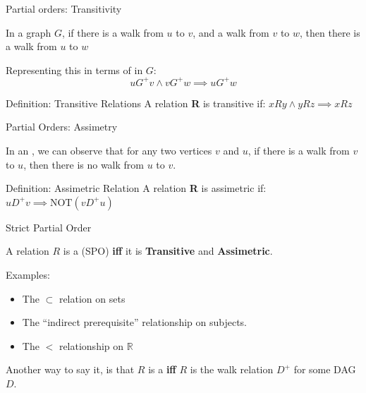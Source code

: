 
\begin{frame}{Partial orders: Transitivity}

  In a graph $G$, if there is a walk from $u$ to $v$, and a walk from $v$ to $w$, then there is a walk from $u$ to $w$
  \begin{center}
  \end{center}\bigskip

  Representing this in terms of  in $G$:
  \begin{equation*}
    uG^+v \land vG^+w \implies uG^+w
  \end{equation*}\bigskip

  \begin{block}{Definition: Transitive Relations}
    A relation {\bf R} is transitive if:\hspace{1cm} $xRy \land yRz \implies xRz$
  \end{block}
\end{frame}

\begin{frame}{Partial Orders: Assimetry}

  In an , we can observe that for any two vertices $v$ and $u$, if there is a walk from $v$ to $u$, then there is no walk from $u$ to $v$.\bigskip

  \begin{block}{Definition: Assimetric Relation}
    A relation {\bf R} is assimetric if: $uD^+v \implies \text{NOT}(vD^+u)$
  \end{block}
\end{frame}

\begin{frame}{Strict Partial Order}

  A relation $R$ is a (SPO) {\bf iff} it is {\bf Transitive} and {\bf Assimetric}.\bigskip

  Examples:
  \begin{itemize}
  \item The $\subset$ relation on sets
  \item The ``indirect prerequisite'' relationship on subjects.
  \item The $<$ relationship on $\mathbb{R}$
  \end{itemize}\bigskip

  Another way to say it, is that $R$ is a  {\bf iff} $R$ is the walk relation $D^+$ for some DAG $D$.
\end{frame}

